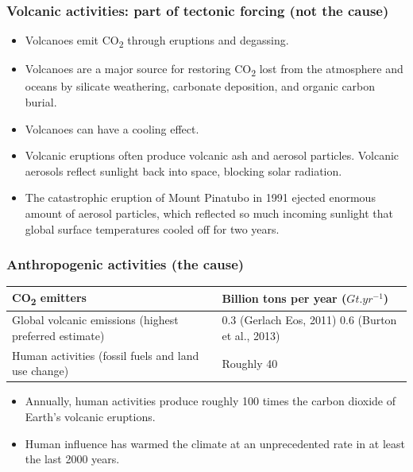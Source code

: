 \documentclass[11pt]{article}
\begin{document}
\subsubsection{Volcanic activities: part of tectonic forcing (not the cause)}
\label{sec:orged5e47f}
\begin{itemize}
\item Volcanoes emit CO\textsubscript{2} through eruptions and degassing.
\item Volcanoes are a major source for restoring CO\textsubscript{2} lost from the atmosphere and oceans by silicate weathering, carbonate deposition, and organic carbon burial.
\item Volcanoes can have a cooling effect.
\item Volcanic eruptions often produce volcanic ash and aerosol particles. Volcanic aerosols reflect sunlight back into space, blocking solar radiation.
\item The catastrophic eruption of Mount Pinatubo in 1991 ejected enormous amount of aerosol particles, which reflected so much incoming sunlight that global surface temperatures cooled off for two years.
\end{itemize}

\newpage

\subsubsection{Anthropogenic activities (the cause)}
\label{sec:orgcbbd25d}

\begin{center}
\begin{tabular}{|m{13em}|m{10em}|}
\hline
CO\textsubscript{2} emitters & Billion tons per year (\(\unit{Gt.yr^{-1}}\))\\[0pt]
\hline
Global volcanic emissions (highest preferred estimate) & 0.3 (Gerlach Eos, 2011) 0.6 (Burton et al., 2013)\\[0pt]
\hline
Human activities (fossil fuels and land use change) & Roughly 40\\[0pt]
\hline
\end{tabular}
\end{center}

\begin{itemize}
\item Annually, human activities produce roughly 100 times the carbon dioxide of Earth's volcanic eruptions.
\item Human influence has warmed the climate at an unprecedented rate in at least the last 2000 years.
\end{itemize}
\end{document}
